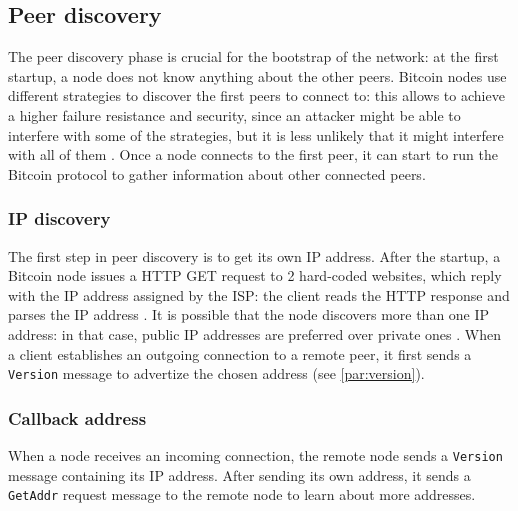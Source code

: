 \subsection{Peer discovery}
\label{sub:discovery}
The peer discovery phase is crucial for the bootstrap of the network:
at the first startup, a node does not know anything about the other peers.
Bitcoin nodes use different strategies to discover the first peers to connect to:
this allows to achieve a higher failure resistance and security, since an attacker might be able to interfere with some of the strategies, but it is less unlikely that it might interfere with all of them \cite{bitcoin_peer_discovery}.
Once a node connects to the first peer, it can start to run the Bitcoin protocol to gather information about other connected peers.

\subsubsection{IP discovery}
The first step in peer discovery is to get its own IP address.
After the startup, a Bitcoin node issues a HTTP GET request to \num{2} hard-coded websites, which reply with the IP address assigned by the \ac{ISP}:
the client reads the HTTP response and parses the IP address \cite{bitcoin_peer_discovery}.
It is possible that the node discovers more than one IP address:
in that case, public IP addresses are preferred over private ones \cite{deanonymisation_2014}.
When a client establishes an outgoing connection to a remote peer, it first sends a \texttt{Version} message to advertize the chosen address (see \cref{par:version}).

\subsubsection{Callback address}
When a node receives an incoming connection, the remote node sends a \texttt{Version} message containing its IP address.
After sending its own address, it sends a \texttt{GetAddr} request message to the remote node to learn about more addresses.

